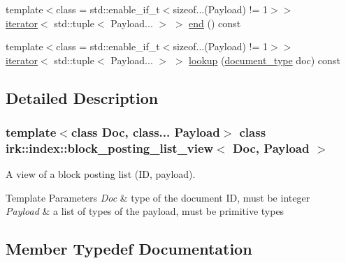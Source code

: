 \begin{DoxyCompactItemize}
\item 
{\footnotesize template$<$class  = std\+::enable\+\_\+if\+\_\+t$<$sizeof...(\+Payload) != 1$>$$>$ }\\\mbox{\hyperlink{classirk_1_1index_1_1block__posting__list__view_1_1iterator}{iterator}}$<$ std\+::tuple$<$ Payload... $>$ $>$ \mbox{\hyperlink{classirk_1_1index_1_1block__posting__list__view_a4d6077530158675e55238d8b506bd86b}{end}} () const
\item 
{\footnotesize template$<$class  = std\+::enable\+\_\+if\+\_\+t$<$sizeof...(\+Payload) != 1$>$$>$ }\\\mbox{\hyperlink{classirk_1_1index_1_1block__posting__list__view_1_1iterator}{iterator}}$<$ std\+::tuple$<$ Payload... $>$ $>$ \mbox{\hyperlink{classirk_1_1index_1_1block__posting__list__view_a8a777f2895961f7cc792a118c909cd78}{lookup}} (\mbox{\hyperlink{classirk_1_1index_1_1block__posting__list__view_a4a778116d22c9cf347f38da132ca0900}{document\+\_\+type}} doc) const
\end{DoxyCompactItemize}


\subsection{Detailed Description}
\subsubsection*{template$<$class Doc, class... Payload$>$\newline
class irk\+::index\+::block\+\_\+posting\+\_\+list\+\_\+view$<$ Doc, Payload $>$}

A view of a block posting list (ID, payload). 


\begin{DoxyTemplParams}{Template Parameters}
{\em Doc} & type of the document ID, must be integer \\
\hline
{\em Payload} & a list of types of the payload, must be primitive types \\
\hline
\end{DoxyTemplParams}


\subsection{Member Typedef Documentation}
\mbox{\label{classirk_1_1index_1_1block__posting__list__view_a4298691f17976ec1cec5bc21ab6132ce}} 
